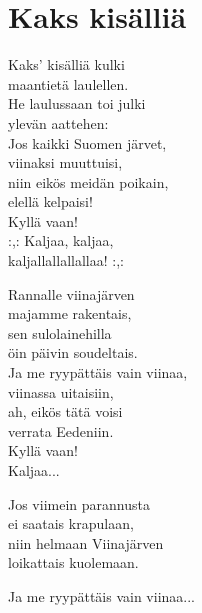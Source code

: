 \section{Kaks kisälliä}

Kaks’ kisälliä kulki\\
maantietä laulellen.\\
He laulussaan toi julki\\
ylevän aattehen:\\
Jos kaikki Suomen järvet, \\
viinaksi muuttuisi,\\
niin eikös meidän poikain,\\
elellä kelpaisi!\\
Kyllä vaan!\\
:,: Kaljaa, kaljaa,\\ kaljallallallallaa! :,:

Rannalle viinajärven\\
majamme rakentais,\\
sen sulolainehilla\\
öin päivin soudeltais. \\
Ja me ryypättäis vain viinaa, \\
viinassa uitaisiin, \\
ah, eikös tätä voisi \\
verrata Eedeniin. \\
Kyllä vaan!\\
Kaljaa...

Jos viimein parannusta \\
ei saatais krapulaan, \\
niin helmaan Viinajärven\\
loikattais kuolemaan.

Ja me ryypättäis vain viinaa...